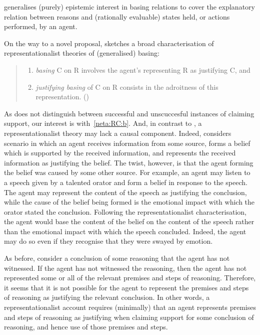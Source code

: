 \begin{note}[Representationalism]
  \citeauthor{Neta:2019aa} generalises (purely) epistemic interest in basing relations to cover the explanatory relation between reasons and (rationally evaluable) states held, or actions performed, by an agent.

  On the way to a novel proposal, \citeauthor{Neta:2019aa} sketches a broad characterisation of representationalist theories of (generalised) basing:
  \begin{quote}
    \begin{enumerate}[label=(R\arabic*), ref=(R\arabic*)]
    \item\label{neta:RC:b} \emph{basing} C on R involves the agent's representing R as justifying C, and
    \item\label{neta:RC:jb} \emph{justifying basing} of C on R consists in the adroitness of this representation.\nolinebreak
          \mbox{}\hfill\mbox{(\citeyear[192]{Neta:2019aa})}
    \end{enumerate}
  \end{quote}
  As \ESU{} does not distinguish between successful and unscuccesful instances of claiming support, our interest is with~\ref{neta:RC:b}.
  And, in contrast to \citeauthor{Moser:1989tv}, a representationalist theory may lack a causal component.
  Indeed, \citeauthor{Neta:2019aa} considers scenario in which an agent receives information from some source, forms a belief which is supported by the received information, and represents the received information as justifying the belief.
  The twist, however, is that the agent forming the belief was caused by some other source.
  For example, an agent may listen to a speech given by a talented orator and form a belief in response to the speech.
  The agent may represent the content of the speech as justifying the conclusion, while the cause of the belief being formed is the emotional impact with which the orator stated the conclusion.
  Following the representationalist characterisation, the agent would base the content of the belief on the content of the speech rather than the emotional impact with which the speech concluded.
  Indeed, the agent may do so even if they recognise that they were swayed by emotion.

  As before, consider a conclusion of some reasoning that the agent has not witnessed.
  If the agent has not witnessed the reasoning, then the agent has not represented some or all of the relevant premises and steps of reasoning.
  Therefore, it seems that it is not possible for the agent to represent the premises and steps of reasoning as justifying the relevant conclusion.
  In other words, a representationalist account requires (minimally) that an agent represents premises and steps of reasoning as justifying when claiming support for some conclusion of reasoning, and hence use of those premises and steps.


\end{note}
